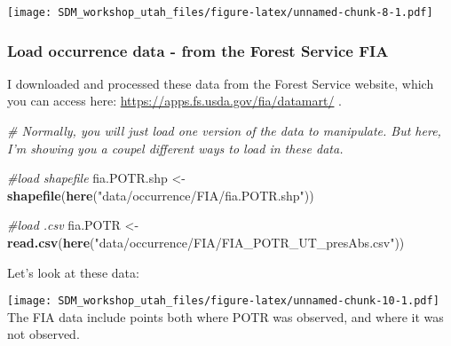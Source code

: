 \documentclass[]{article}
\newenvironment{Shaded}{\begin{snugshade}}{\end{snugshade}}
\newcommand{\KeywordTok}[1]{\textcolor[rgb]{0.13,0.29,0.53}{\textbf{#1}}}
\newcommand{\DataTypeTok}[1]{\textcolor[rgb]{0.13,0.29,0.53}{#1}}
\newcommand{\DecValTok}[1]{\textcolor[rgb]{0.00,0.00,0.81}{#1}}
\newcommand{\FloatTok}[1]{\textcolor[rgb]{0.00,0.00,0.81}{#1}}
\newcommand{\StringTok}[1]{\textcolor[rgb]{0.31,0.60,0.02}{#1}}
\newcommand{\CommentTok}[1]{\textcolor[rgb]{0.56,0.35,0.01}{\textit{#1}}}
\newcommand{\OperatorTok}[1]{\textcolor[rgb]{0.81,0.36,0.00}{\textbf{#1}}}
\newcommand{\NormalTok}[1]{#1}
\begin{document}
\texttt{[image: SDM\_workshop\_utah\_files/figure-latex/unnamed-chunk-8-1.pdf]}

\subsubsection{Load occurrence data - from the Forest Service
FIA}\label{load-occurrence-data---from-the-forest-service-fia}

I downloaded and processed these data from the Forest Service website,
which you can access here: \url{https://apps.fs.usda.gov/fia/datamart/}
.

\begin{Shaded}
\begin{Highlighting}[]
\CommentTok{# Normally, you will just load one version of the data to manipulate. But here, I'm showing you a coupel different ways to load in these data.}

\CommentTok{#load shapefile}
\NormalTok{fia.POTR.shp <-}\StringTok{ }\KeywordTok{shapefile}\NormalTok{(}\KeywordTok{here}\NormalTok{(}\StringTok{"data/occurrence/FIA/fia.POTR.shp"}\NormalTok{))}

\CommentTok{#load .csv}
\NormalTok{fia.POTR <-}\StringTok{ }\KeywordTok{read.csv}\NormalTok{(}\KeywordTok{here}\NormalTok{(}\StringTok{"data/occurrence/FIA/FIA_POTR_UT_presAbs.csv"}\NormalTok{))}
\end{Highlighting}
\end{Shaded}

Let's look at these data:

\begin{Shaded}
\end{Shaded}

\texttt{[image: SDM\_workshop\_utah\_files/figure-latex/unnamed-chunk-10-1.pdf]}
The FIA data include points both where POTR was observed, and where it
was not observed.
\end{document}
